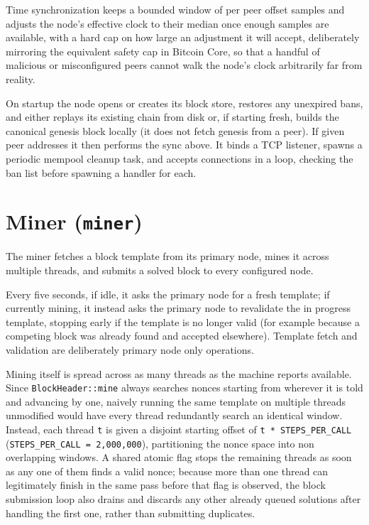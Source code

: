 \documentclass[11pt]{article}
\newcommand{\code}[1]{\texttt{#1}}
\begin{document}
Time synchronization keeps a bounded window of per peer offset samples and adjusts the node's effective clock to their median once enough samples are available, with a hard cap on how large an adjustment it will accept, deliberately mirroring the equivalent safety cap in Bitcoin Core, so that a handful of malicious or misconfigured peers cannot walk the node's clock arbitrarily far from reality.

On startup the node opens or creates its block store, restores any unexpired bans, and either replays its existing chain from disk or, if starting fresh, builds the canonical genesis block locally (it does not fetch genesis from a peer). If given peer addresses it then performs the sync above. It binds a TCP listener, spawns a periodic mempool cleanup task, and accepts connections in a loop, checking the ban list before spawning a handler for each.

\section{Miner (\code{miner})}

The miner fetches a block template from its primary node, mines it across multiple threads, and submits a solved block to every configured node.

Every five seconds, if idle, it asks the primary node for a fresh template; if currently mining, it instead asks the primary node to revalidate the in progress template, stopping early if the template is no longer valid (for example because a competing block was already found and accepted elsewhere). Template fetch and validation are deliberately primary node only operations.

Mining itself is spread across as many threads as the machine reports available. Since \code{BlockHeader::mine} always searches nonces starting from wherever it is told and advancing by one, naively running the same template on multiple threads unmodified would have every thread redundantly search an identical window. Instead, each thread \code{t} is given a disjoint starting offset of \code{t * STEPS\_PER\_CALL} (\code{STEPS\_PER\_CALL = 2{,}000{,}000}), partitioning the nonce space into non overlapping windows. A shared atomic flag stops the remaining threads as soon as any one of them finds a valid nonce; because more than one thread can legitimately finish in the same pass before that flag is observed, the block submission loop also drains and discards any other already queued solutions after handling the first one, rather than submitting duplicates.
\end{document}
